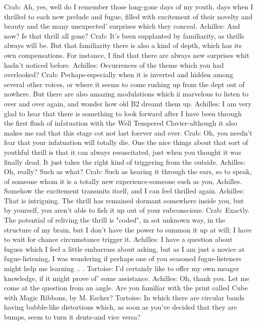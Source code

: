 Crab: Ah, yes, well do I remember those long-gone days of my youth, days when I
   thrilled to each new prelude and fugue, filled with excitement of their novelty and
   beauty and the many unexpected' surprises which they conceal.
Achilles: And now? Is that thrill all gone?
Crab: It's been supplanted by familiarity, as thrills always will be. But that familiarity
   there is also a kind of depth, which has its own compensations. For instance, I find
   that there are always new surprises whit hadn't noticed before.
Achilles: Occurrences of the theme which you had overlooked?
Crab: Perhaps-especially when it is inverted and hidden among several other voices, or
   where it seems to come rushing up from the dept out of nowhere. But there are also
   amazing modulations which ii marvelous to listen to over and over again, and wonder
   how old B2 dreamt them up.
Achilles: I am very glad to hear that there is something to look forward after I have been
   through the first flush of infatuation with the Well Tempered Clavier-although it also
   makes me sad that this stage cot not last forever and ever.
Crab: Oh, you needn't fear that your infatuation will totally die. One the nice things about
   that sort of youthful thrill is that it can always resuscitated, just when you thought it
   was finally dead. It just takes the right kind of triggering from the outside.
Achilles: Oh, really? Such as what?
Crab: Such as hearing it through the ears, so to speak, of someone whom it is a totally
   new experience-someone such as you, Achilles. Somehow the excitement transmits
   itself, and I can feel thrilled again.
Achilles: That is intriguing. The thrill has remained dormant somewhere inside you, but
   by yourself, you aren't able to fish it up out of your subconscious.
Crab: Exactly. The potential of reliving the thrill is "coded", in sot unknown way, in the
   structure of my brain, but I don't have the power to summon it up at will; I have to
   wait for chance circumstance trigger it.
Achilles: I have a question about fugues which I feel a little embarrass about asking, but
   as I am just a novice at fugue-listening, I was wondering if perhaps one of you
   seasoned fugue-listeners might help me learning .. .
Tortoise: I'd certainly like to offer my own meager knowledge, if it might prove of' some
   assistance.
Achilles: Oh, thank you. Let me come at the question from an angle. Are you familiar
   with the print called Cube with Magic Ribbons, by M. Escher?
Tortoise: In which there are circular bands having bubble-like distortions which, as soon
   as you've decided that they are bumps, seem to turn it dents-and vice versa?




